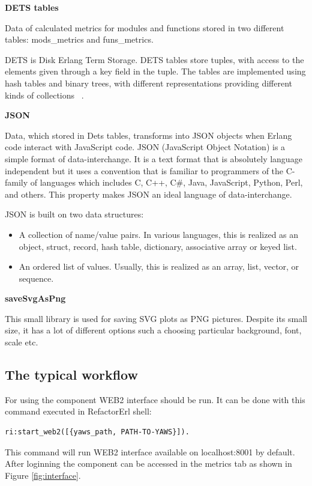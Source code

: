 \textbf{DETS tables}

Data of calculated metrics for modules and functions stored in two different tables: mods\_metrics and funs\_metrics.

DETS is Disk Erlang Term Storage. DETS tables store tuples, with access to the elements given through a  key field in the tuple. The tables are implemented using hash tables and binary trees, with different representations providing different kinds of collections ~\cite{erland_o'reilly}.

\textbf{JSON}

Data, which stored in Dets tables, transforms into JSON objects when Erlang code interact with JavaScript code. JSON (JavaScript Object Notation) is a simple format of data-interchange. It is a text format that is absolutely language independent but it uses a convention that is familiar to programmers of the C-family of languages which includes C, C++, C\#, Java, JavaScript, Python, Perl, and others. This property makes JSON an ideal language of data-interchange.

JSON is built on two data structures:
\begin{itemize}
	\item A collection of name/value pairs. In various languages, this is realized as an object, struct, record, hash table, dictionary, associative array or keyed list.
	\item An ordered list of values. Usually, this is realized as an array, list, vector, or sequence.
\end{itemize}

\textbf{saveSvgAsPng}

This small library is used for saving SVG plots as PNG pictures. Despite its small size, it has a lot of different options such a choosing particular background, font, scale etc. 

\subsection{The typical workflow}

For using the component WEB2 interface should be run. It can be done with this command executed in RefactorErl shell:

\begin{lstlisting}[frame=none, numbers=none]
	ri:start_web2([{yaws_path, PATH-TO-YAWS}]).
\end{lstlisting}

This command will run WEB2 interface available on localhost:8001 by default. After loginning the component can be accessed in the metrics tab as shown in Figure \ref{fig:interface}.

